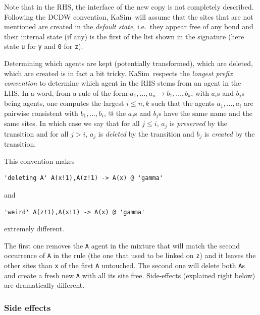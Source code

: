 \documentclass[11pt]{book}
\def\KaSim{\textsf{KaSim}}
\def\ttt#1{\texttt{#1}}
\def\rar{\rightarrow}
\def\ie{i.e.~}
\begin{document}
Note that in the RHS, the interface of the new copy is not completely
described. Following the DCDW convention, \KaSim~will assume that the sites that are not
mentioned are created in the \emph{default state}, {\ie}they appear free of any bond and their internal state
(if any) is the first of the list shown in the signature (here state \ttt{u} for \ttt{y} and \ttt{0} for \ttt{z}).

Determining which agents are kept (potentially transformed), which
are deleted, which are created is in fact a bit tricky.
\KaSim~respects the \emph{longest prefix convention} to determine which agent in the RHS stems from an
agent in the LHS.  In a word, from a rule of the form
$a_1,\dots,a_n\rar b_1,\dots,b_k$, with $a_i$s and $b_j$s being
agents, one computes the largest $i\leq n,k$ such that the agents
$a_1,\dots,a_i$ are pairwise consistent with $b_1,\dots,b_i$, @ the
$a_j$s and $b_j$s have the same name and the same sites. In which case
we say that for all $j\leq i$, $a_j$ is \emph{preserved} by the
transition and for all $j>i$, $a_j$ is \emph{deleted} by the
transition and $b_j$ is \emph{created} by the transition.

This convention makes
\begin{lstlisting}[language=kappa]
'deleting A' A(x!1),A(z!1) -> A(x) @ 'gamma'
\end{lstlisting}
and
\begin{lstlisting}[language=kappa]
'weird' A(z!1),A(x!1) -> A(x) @ 'gamma'
\end{lstlisting}
extremely different.

The first one removes the \ttt{A} agent in the mixture
that will match the second occurrence of \ttt{A} in the rule (the one
that used to be linked on \ttt{z}) and it leaves the other sites than
\ttt{x} of the first \ttt{A} untouched.  The second one will delete
both \ttt{A}s and create a fresh new \ttt{A} with all its site
free. Side-effects (explained right below) are dramatically different.

\subsubsection*{Side effects}\label{sec:side-effect}
\end{document}
